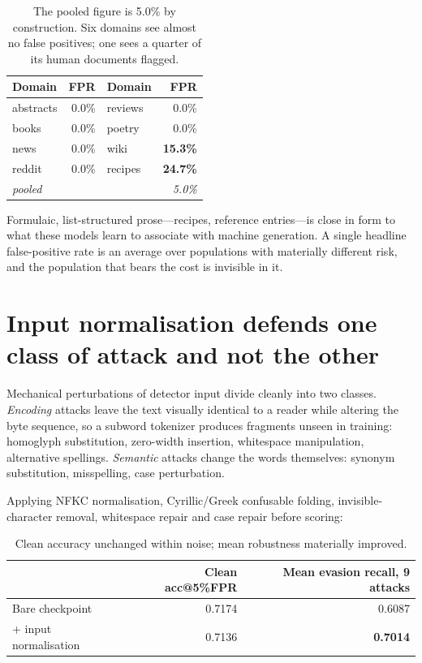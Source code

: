 \documentclass[11pt]{article}
\begin{document}
\begin{table}[h]
\centering
\begin{tabular}{lrlr}
\toprule
Domain & FPR & Domain & FPR \\
\midrule
abstracts & 0.0\% & reviews & 0.0\% \\
books     & 0.0\% & poetry  & 0.0\% \\
news      & 0.0\% & wiki    & \textbf{15.3\%} \\
reddit    & 0.0\% & recipes & \textbf{24.7\%} \\
\midrule
\multicolumn{3}{l}{\emph{pooled}} & \emph{5.0\%} \\
\bottomrule
\end{tabular}
\caption{The pooled figure is 5.0\% by construction. Six domains see almost no
false positives; one sees a quarter of its human documents flagged.}
\end{table}

Formulaic, list-structured prose---recipes, reference entries---is close in form
to what these models learn to associate with machine generation. A single
headline false-positive rate is an average over populations with materially
different risk, and the population that bears the cost is invisible in it.

\section{Input normalisation defends one class of attack and not the other}
\label{sec:normalisation}

Mechanical perturbations of detector input divide cleanly into two classes.
\emph{Encoding} attacks leave the text visually identical to a reader while
altering the byte sequence, so a subword tokenizer produces fragments unseen in
training: homoglyph substitution, zero-width insertion, whitespace manipulation,
alternative spellings. \emph{Semantic} attacks change the words themselves:
synonym substitution, misspelling, case perturbation.

Applying NFKC normalisation, Cyrillic/Greek confusable folding,
invisible-character removal, whitespace repair and case repair before scoring:

\begin{table}[h]
\centering
\begin{tabular}{lrr}
\toprule
& Clean acc@5\%FPR & Mean evasion recall, 9 attacks \\
\midrule
Bare checkpoint            & 0.7174 & 0.6087 \\
+ input normalisation      & 0.7136 & \textbf{0.7014} \\
\bottomrule
\end{tabular}
\caption{Clean accuracy unchanged within noise; mean robustness materially
improved.}
\end{table}
\end{document}
